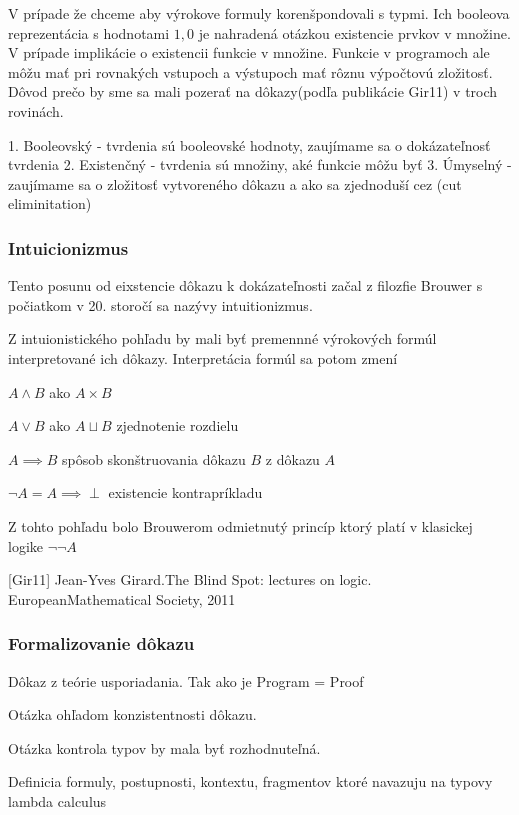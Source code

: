 \documentclass[a4paper,10pt,oneside]{report}%
\begin{document}
V prípade že chceme aby výrokove formuly korenšpondovali s typmi.
Ich booleova reprezentácia s hodnotami $1,0$ je nahradená otázkou existencie prvkov v množine.
V prípade implikácie o existencii funkcie v množine.
Funkcie v programoch ale môžu mať pri rovnakých vstupoch a výstupoch mať rôznu výpočtovú zložitosť.
Dôvod prečo by sme sa mali pozerať na dôkazy(podľa publikácie Gir11) v troch rovinách.

1. Booleovský - tvrdenia sú booleovské hodnoty, zaujímame sa o dokázateľnosť tvrdenia
2. Existenčný - tvrdenia sú množiny, aké funkcie môžu byť
3. Úmyselný - zaujímame sa o zložitosť vytvoreného dôkazu a ako sa zjednoduší cez (cut eliminitation)

\subsubsection{Intuicionizmus}

Tento posunu od eixstencie dôkazu k dokázateľnosti začal z filozfie Brouwer s počiatkom v 20. storočí sa nazývy intuitionizmus.

Z intuionistického pohľadu by mali byť premennné výrokových formúl interpretované ich dôkazy. Interpretácia formúl sa potom zmení

$ A \wedge B $ ako $ A \times B $

$ A \vee B $ ako $ A \sqcup B $ zjednotenie rozdielu

$ A \implies B $ spôsob skonštruovania dôkazu $ B $ z dôkazu $ A $

$ \neg A = A \implies \perp $ existencie kontrapríkladu

Z tohto pohľadu bolo Brouwerom odmietnutý princíp ktorý platí v klasickej logike $ \neg \neg A $ 

[Gir11] Jean-Yves Girard.The Blind Spot: lectures on logic. EuropeanMathematical Society, 2011

\subsubsection{Formalizovanie dôkazu}

Dôkaz z teórie usporiadania. Tak ako je Program = Proof

Otázka ohľadom konzistentnosti dôkazu.

Otázka kontrola typov by mala byť rozhodnuteľná.

Definicia formuly, postupnosti, kontextu, fragmentov ktoré navazuju na typovy lambda calculus
\end{document}
